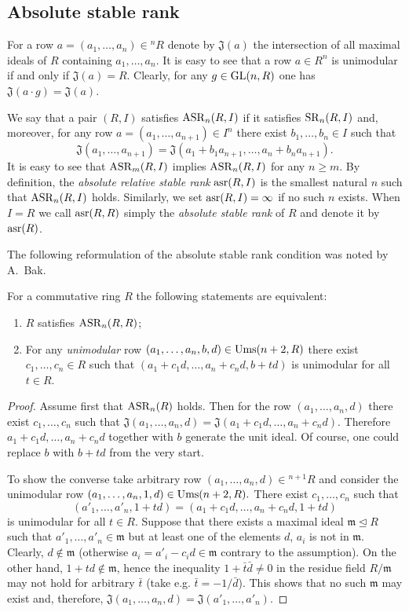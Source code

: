 \subsection{Absolute stable rank}
For a row $a=(a_1,\ldots,a_n)\in{}^n\!R$ denote by $\mathfrak{J}(a)$ the intersection of all maximal ideals of $R$ containing $a_1,\ldots,a_n$.
It is easy to see that a row $a\in R^n$ is unimodular if and only if $\mathfrak{J}(a)=R$. 
Clearly, for any $g\in\operatorname{GL}(n,R)$ one has $\mathfrak{J}(a\cdot g)=\mathfrak{J}(a)$.
\begin{dfn}
We say that a pair $(R,I)$ satisfies $\operatorname{ASR}_n(R,I)$ if it satisfies $\operatorname{SR}_n(R,I)$ and, moreover, 
for any row $a=(a_1,\ldots,a_{n+1})\in I^n$ there exist $b_1,\ldots,b_n\in I$ such that
\[\mathfrak{J}(a_1,\ldots,a_{n+1})=\mathfrak{J}(a_1+b_1a_{n+1},\ldots,a_n+b_na_{n+1}).\]
It is easy to see that $\operatorname{ASR}_m(R,I)$ implies $\operatorname{ASR}_n(R,I)$ for any $n\geqslant m$. 
By definition, the \emph{absolute relative stable rank} $\operatorname{asr}(R,I)$ is the smallest natural $n$ such that $\operatorname{ASR}_n(R, I)$ holds. 
Similarly, we set $\operatorname{asr}(R,I)=\infty$ if no such $n$ exists.
When $I=R$ we call $\operatorname{asr}(R, R)$ simply the \emph{absolute stable rank} of $R$ and denote it by $\operatorname{asr}(R)$.
\end{dfn}
The following reformulation of the absolute stable rank condition was noted by A.~Bak.
\begin{lemma} For a commutative ring $R$ the following statements are equivalent:
\begin{enumerate}
 \item\label{asr_Stein} $R$ satisfies $\operatorname{ASR}_n(R, R)$;
 \item\label{asr_Bak} For any \emph{unimodular} row $(a_1,\ldots,a_n,b,d)\in\operatorname{Ums}(n+2,R)$ there exist $c_1,\ldots,c_n\in R$ such that $(a_1+c_1d,\ldots,a_n+c_nd,b+td)$ is unimodular for all $t\in R$.
\end{enumerate}
\end{lemma}
\begin{proof}
Assume first that $\operatorname{ASR}_n(R)$ holds.
Then for the row $(a_1,\ldots,a_n,d)$ there exist $c_1,\ldots,c_n$ such that $\mathfrak{J}(a_1,\ldots,a_n,d)=\mathfrak{J}(a_1+c_1d,\ldots,a_n+c_nd)$. 
Therefore $a_1+c_1d,\ldots,a_n+c_nd$ together with $b$ generate the unit ideal.
Of course, one could replace $b$ with $b+td$ from the very start.

To show the converse take arbitrary row $(a_1,\ldots,a_n,d)\in{}^{n+1}\!R$ and consider the unimodular row $(a_1,\ldots,a_n,1,d)\in\operatorname{Ums}(n+2,R).$
There exist $c_1,\ldots,c_n$ such that \[(a'_1,\ldots,a'_n,1+td)=(a_1+c_1d,\ldots,a_n+c_nd,1+td)\] is unimodular for all $t\in R$.
Suppose that there exists a maximal ideal $\mathfrak{m}\trianglelefteq R$ such that $a'_1,\ldots,a'_n\in\mathfrak{m}$ but at least one of the elements $d$, $a_i$ is not in $\mathfrak{m}$.
Clearly, $d\notin\mathfrak{m}$ (otherwise $a_i=a'_i-c_id\in\mathfrak{m}$ contrary to the assumption).
On the other hand, $1+td\notin\mathfrak{m}$,
hence the inequality $1+\bar{t}\bar{d}\neq0$ in the residue field $R/\mathfrak{m}$ may not hold for arbitrary $\bar{t}$ 
(take e.g. $\bar{t}=-1/\bar{d}$).
This shows that no such $\mathfrak{m}$ may exist and, therefore, $\mathfrak{J}(a_1,\ldots,a_n,d)=\mathfrak{J}(a'_1,\ldots,a'_n)$.
\end{proof}

